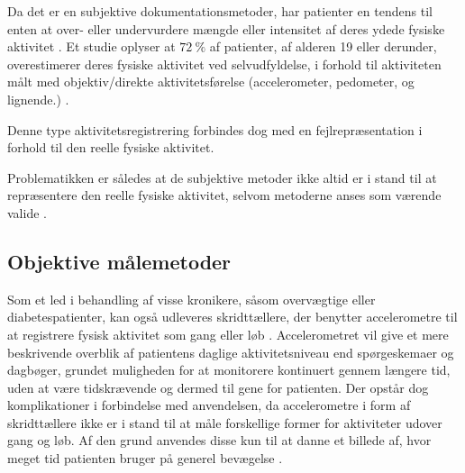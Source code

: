 Da det er en subjektive dokumentationsmetoder, har patienter en tendens til enten at over- eller undervurdere mængde eller intensitet af deres ydede fysiske aktivitet \citep{adamo2009}. 
Et studie oplyser at $72~\%$ af patienter, af alderen 19 eller derunder, overestimerer deres fysiske aktivitet ved selvudfyldelse, i forhold til aktiviteten målt med objektiv/direkte aktivitetsførelse (accelerometer, pedometer, og lignende.) \citep{adamo2009}.

Denne type aktivitetsregistrering forbindes dog med en fejlrepræsentation i forhold til den reelle fysiske aktivitet. 

Problematikken er således at de subjektive metoder ikke altid er i stand til at repræsentere den reelle fysiske aktivitet, selvom metoderne anses som værende valide \citep{pedersen2011, motionsraad2007}. 

\subsection{Objektive målemetoder}

Som et led i behandling af visse kronikere, såsom overvægtige eller diabetespatienter, kan også udleveres skridttællere, der benytter accelerometre til at registrere fysisk aktivitet som gang eller løb \citep{muller2009, jensen2012, snorgaard2010}. 
Accelerometret vil give et mere beskrivende overblik af patientens daglige aktivitetsniveau end spørgeskemaer og dagbøger, grundet muligheden for at monitorere kontinuert gennem længere tid, uden at være tidskrævende og dermed til gene for patienten. 
Der opstår dog komplikationer i forbindelse med anvendelsen, da accelerometre i form af skridttællere ikke er i stand til at måle forskellige former for aktiviteter udover gang og løb. 
Af den grund anvendes disse kun til at danne et billede af, hvor meget tid patienten bruger på generel bevægelse  \citep{motionsraad2007}.